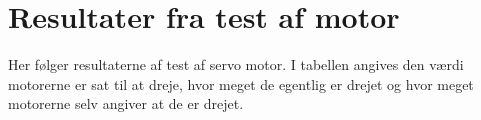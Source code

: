 \section{Resultater fra test af motor}
Her følger resultaterne af test af \legos servo motor.
I tabellen angives den værdi motorerne er sat til at dreje, hvor meget de egentlig er drejet og hvor meget motorerne selv angiver at de er drejet.

